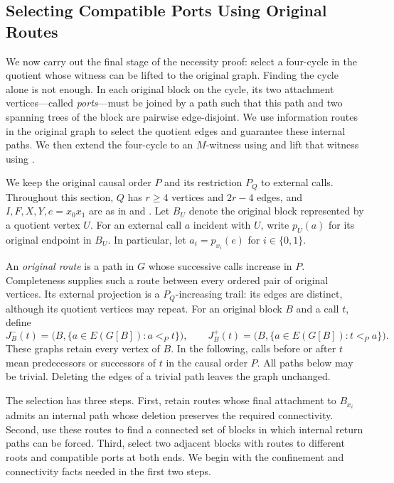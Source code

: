 \documentclass[USenglish, a4paper, thm-restate,numberwithinsect, cleveref]{lipics-v2021}
\begin{document}
\subsection{Selecting Compatible Ports Using Original Routes}
\label{sec:necessity-ports}

We now carry out the final stage of the necessity proof: select a
four-cycle in the quotient whose witness can be lifted to the original
graph. Finding the cycle alone is not enough. In each original block
on the cycle, its two attachment vertices---called \emph{ports}---must
be joined by a path such that this path and two spanning trees of the
block are pairwise edge-disjoint. We use information routes in the
original graph to select the quotient edges and guarantee these
internal paths. We then extend the four-cycle to an $M$-witness using
 and lift that witness
using .

We keep the original causal order $P$ and its restriction $P_Q$ to
external calls. Throughout this section, $Q$ has $r\ge4$ vertices and
$2r-4$ edges, and $I,F,X,Y,e=x_0x_1$ are as in
 and
. Let $B_U$ denote the original
block represented by a quotient vertex $U$. For an external call $a$
incident with $U$, write $p_U(a)$ for its original endpoint in $B_U$.
In particular, let $a_i=p_{x_i}(e)$ for $i\in\{0,1\}$.

An \emph{original route} is a path in $G$ whose successive calls
increase in $P$. Completeness supplies such a route between every
ordered pair of original vertices. Its external projection is a
$P_Q$-increasing trail: its edges are distinct, although its quotient
vertices may repeat. For an original block $B$ and a call $t$, define
\[
 J_B^-(t)=\bigl(B,\{a\in E(G[B]):a<_P t\}\bigr),\qquad
 J_B^+(t)=\bigl(B,\{a\in E(G[B]):t<_P a\}\bigr).
\]
These graphs retain every vertex of $B$. In the following, calls before
or after $t$ mean predecessors or successors of $t$ in the causal
order $P$. All paths below may be
trivial. Deleting the edges of a trivial path leaves the graph
unchanged.

The selection has three steps. First, retain routes whose final
attachment to $B_{x_i}$ admits an internal path whose deletion
preserves the required connectivity. Second, use these routes to find
a connected set of blocks in which internal return paths can be
forced. Third, select two adjacent blocks with routes to different
roots and compatible ports at both ends. We begin with the confinement and connectivity facts
needed in the first two steps.
\end{document}

